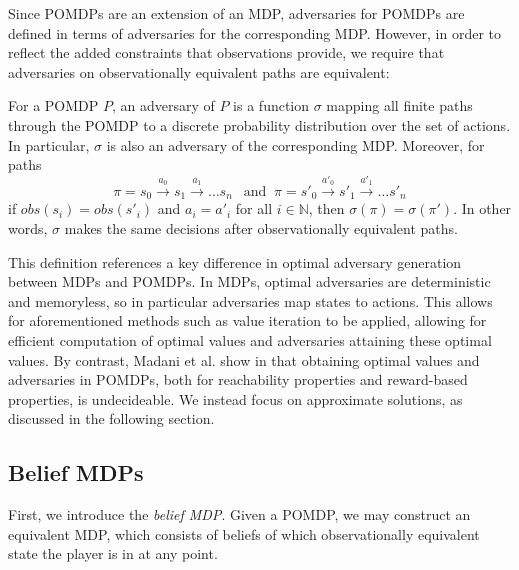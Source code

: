 Since POMDPs are an extension of an MDP, adversaries for POMDPs are defined in terms of adversaries for the corresponding MDP. However, in order to reflect the added constraints that observations provide, we require that adversaries on observationally equivalent paths are equivalent:

\begin{definition}
\label{cs1:pomdp_strats}

For a POMDP $P$, an adversary of $P$ is a function $\sigma$ mapping all finite paths through the POMDP to a discrete probability distribution over the set of actions. In particular, $\sigma$ is also an adversary of the corresponding MDP. Moreover, for paths
\[
\pi = s_0 \xrightarrow{a_0} s_1 \xrightarrow{a_1} \dots s_n \;\;\ \mbox{and} \;\; \pi = s'_0 \xrightarrow{a'_0} s'_1 \xrightarrow{a'_1} \dots s'_n
\]
if $obs(s_i) = obs(s'_i)$ and $a_i = a'_i$ for all $i \in \mathbb{N}$, then $\sigma(\pi) = \sigma(\pi')$. In other words, $\sigma$ makes the same decisions after observationally equivalent paths.

\end{definition}

This definition references a key difference in optimal adversary generation between MDPs and POMDPs. In MDPs, optimal adversaries are deterministic and memoryless, so in particular adversaries map states to actions. This allows for aforementioned methods such as value iteration to be applied, allowing for efficient computation of optimal values and adversaries attaining these optimal values. By contrast, Madani et al. show in \cite{madani_undecidability_2003} that obtaining optimal values and adversaries in POMDPs, both for reachability properties and reward-based properties, is undecideable. We instead focus on approximate solutions, as discussed in the following section.

\subsection{Belief MDPs}

First, we introduce the \emph{belief MDP}. Given a POMDP, we may construct an equivalent MDP, which consists of beliefs of which observationally equivalent state the player is in at any point.

